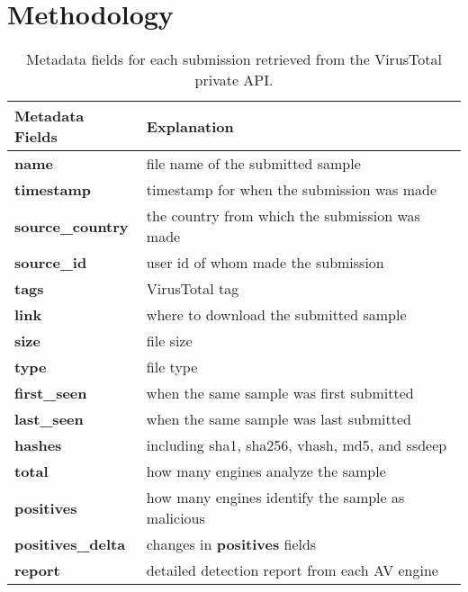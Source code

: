 \section{Methodology}
\label{sec:meth}




\begin{table}[h!]
\centering
\footnotesize
{
\begin{tabular}{l|l}
\hline
Metadata Fields & Explanation \\
\hline                            
{\bf name}      & file name of the submitted sample \\
{\bf timestamp} & timestamp for when the submission was made \\
{\bf source\_country} & the country from which the submission was made \\
{\bf source\_id} & user id of whom made the submission\\
{\bf tags} & VirusTotal tag \\
{\bf link} & where to download the submitted sample \\
{\bf size} & file size \\
{\bf type} & file type \\
{\bf first\_seen} & when the same sample was first submitted \\
{\bf last\_seen} & when the same sample was last submitted \\
{\bf hashes} & including sha1, sha256, vhash, md5, and ssdeep\\
{\bf total} & how many engines analyze the sample\\
{\bf positives} & how many engines identify the sample as malicious \\
{\bf positives\_delta} & changes in {\bf positives} fields \\
{\bf report} & detailed detection report from each AV engine \\
\hline

\end{tabular}
}
\caption{Metadata fields for each submission retrieved from the VirusTotal private API.}
\label{tab:fields}
\end{table}



